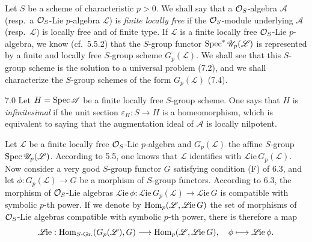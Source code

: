 Let $S$ be a scheme of characteristic $p>0$. We shall say that a $\mathcal{O}_S$-algebra $\mathscr A$ (resp.\ a $\mathcal{O}_S$-Lie $p$-algebra $\mathscr L$) is \emph{finite locally free} if the $\mathcal{O}_S$-module underlying $\mathscr A$ (resp.\ $\mathscr L$) is locally free and of finite type. If $\mathscr L$ is a finite locally free $\mathcal{O}_S$-Lie $p$-algebra, we know (cf.\ 5.5.2) that the $S$-group functor $\operatorname{Spec}^*\mathscr U_p(\mathscr L)$ is represented by a finite and locally free $S$-group scheme $G_p(\mathscr L)$. We shall see that this $S$-group scheme is the solution to a universal problem (7.2), and we shall characterize the $S$-group schemes of the form $G_p(\mathscr L)$ (7.4).

\begin{definition}{7.0}\label{VIIA.7.0}
Let $H=\operatorname{Spec}\mathscr A$ be a finite locally free $S$-group scheme. One says that $H$ is \emph{infinitesimal} if the unit section $\varepsilon_H:S\to H$ is a homeomorphism, which is equivalent to saying that the augmentation ideal of $\mathscr A$ is locally nilpotent.
\end{definition}

Let $\mathscr L$ be a finite locally free $\mathcal{O}_S$-Lie $p$-algebra and $G_p(\mathscr L)$ the affine $S$-group $\operatorname{Spec}\mathscr U_p(\mathscr L)$. According to 5.5, one knows that $\mathscr L$ identifies with $\mathscr L\!\mathrm{ie}\,G_p(\mathscr L)$.
Now consider a very good $S$-group functor $G$ satisfying condition (F) of 6.3, and let $\phi:G_p(\mathscr L)\to G$ be a morphism of $S$-group functors. According to 6.3, the morphism of $\mathcal{O}_S$-Lie algebras $\mathscr L\!\mathrm{ie}\,\phi:\mathscr L\!\mathrm{ie}\,G_p(\mathscr L)\to\mathscr L\!\mathrm{ie}\,G$ is compatible with symbolic $p$-th power. If we denote by $\operatorname{Hom}_p(\mathscr L,\mathscr L\!\mathrm{ie}\,G)$ the set of morphisms of $\mathcal{O}_S$-Lie algebras compatible with symbolic $p$-th power, there is therefore a map
\[
\mathscr L\!\mathrm{ie}:\operatorname{Hom}_{S\text{-Gr.}}(G_p(\mathscr L),G)\longrightarrow\operatorname{Hom}_p(\mathscr L,\mathscr L\!\mathrm{ie}\,G),\quad\phi\longmapsto\mathscr L\!\mathrm{ie}\,\phi.
\]

